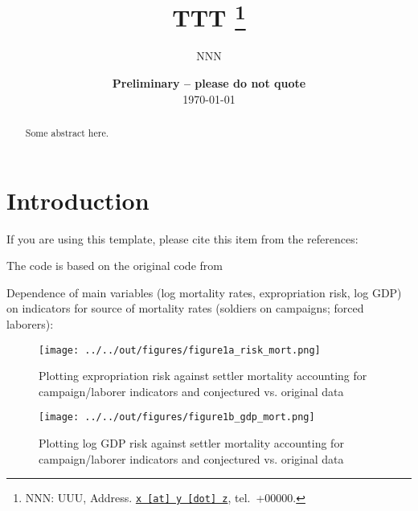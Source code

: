 \documentclass[11pt, a4paper, leqno]{article}
\begin{document}
\title{TTT
\thanks{NNN: UUU, Address. \href{mailto:x@y.z} {\nolinkurl{x [at] y [dot] z}}, tel.~+00000.}
}

\author{NNN
}

\date{
{\bf Preliminary -- please do not quote} 
\\[1ex] 
\today
}

\maketitle


\begin{abstract}
	Some abstract here.
\end{abstract}
\clearpage

\section{Introduction} %
\label{sec:introduction}

If you are using this template, please cite this item from the references: \citet{Gaudecker13}

The code is based on the original code from \citet{Albouy12}

Dependence of main variables (log mortality rates, expropriation risk, log GDP) on indicators for source of mortality rates (soldiers on campaigns; forced laborers):
	
\clearpage


\begin{figure}
    \caption{Plotting expropriation risk against settler mortality accounting for campaign/laborer indicators and conjectured vs. original data}    
	\texttt{[image: ../../out/figures/figure1a\_risk\_mort.png]}
\end{figure}


\begin{figure}
    \caption{Plotting log GDP risk against settler mortality accounting for campaign/laborer indicators and conjectured vs. original data}    
	\texttt{[image: ../../out/figures/figure1b\_gdp\_mort.png]}
\end{figure}

\clearpage






\printbibliography

\end{document}
